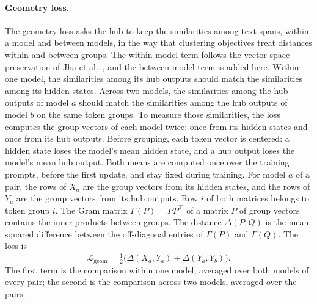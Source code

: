 \paragraph{Geometry loss.} The geometry loss asks the hub to keep the similarities among text spans, within a model and between models, in the way that clustering objectives treat distances within and between groups.
The within-model term follows the vector-space preservation of Jha et al.~\cite{jha2025harnessing}, and the between-model term is added here.
Within one model, the similarities among its hub outputs should match the similarities among its hidden states.
Across two models, the similarities among the hub outputs of model $a$ should match the similarities among the hub outputs of model $b$ on the same token groups.
To measure those similarities, the loss computes the group vectors of each model twice: once from its hidden states and once from its hub outputs.
Before grouping, each token vector is centered: a hidden state loses the model's mean hidden state, and a hub output loses the model's mean hub output.
Both means are computed once over the training prompts, before the first update, and stay fixed during training.
For model $a$ of a pair, the rows of $X_a$ are the group vectors from its hidden states, and the rows of $Y_a$ are the group vectors from its hub outputs.
Row $i$ of both matrices belongs to token group $i$.
The Gram matrix $\Gamma(P) = PP^{\top}$ of a matrix $P$ of group vectors contains the inner products between groups.
The distance $\Delta(P,Q)$ is the mean squared difference between the off-diagonal entries of $\Gamma(P)$ and $\Gamma(Q)$.
The loss is
\begin{equation}
\mathcal{L}_{\text{geom}} = \tfrac{1}{2}\Big(\overline{\Delta(X_a, Y_a)} + \overline{\Delta(Y_a, Y_b)}\Big).
\label{eq:hub:geom}
\end{equation}
The first term is the comparison within one model, averaged over both models of every pair; the second is the comparison across two models, averaged over the pairs.

